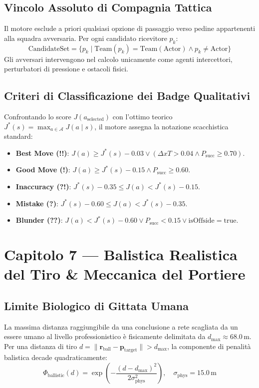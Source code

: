 \documentclass[11pt,a4paper]{article}
\begin{document}
\subsection{Vincolo Assoluto di Compagnia Tattica}
Il motore esclude a priori qualsiasi opzione di passaggio verso pedine appartenenti alla squadra avversaria. Per ogni candidato ricevitore $p_k$:
\begin{equation}
\text{CandidateSet} = \{ p_k \mid \text{Team}(p_k) = \text{Team}(\text{Actor}) \land p_k \ne \text{Actor} \}
\end{equation}
Gli avversari intervengono nel calcolo unicamente come agenti intercettori, perturbatori di pressione e ostacoli fisici.

\subsection{Criteri di Classificazione dei Badge Qualitativi}
Confrontando lo score $J(a_{\text{selected}})$ con l'ottimo teorico $J^*(s) = \max_{a \in \mathcal{A}} J(a \mid s)$, il motore assegna la notazione scacchistica standard:
\begin{itemize}
    \item \textbf{Best Move (!!)}: $J(a) \ge J^*(s) - 0.03 \lor (\Delta xT > 0.04 \land P_{\text{succ}} \ge 0.70)$.
    \item \textbf{Good Move (!)}: $J(a) \ge J^*(s) - 0.15 \land P_{\text{succ}} \ge 0.60$.
    \item \textbf{Inaccuracy (?!)}: $J^*(s) - 0.35 \le J(a) < J^*(s) - 0.15$.
    \item \textbf{Mistake (?)}: $J^*(s) - 0.60 \le J(a) < J^*(s) - 0.35$.
    \item \textbf{Blunder (??)}: $J(a) < J^*(s) - 0.60 \lor P_{\text{succ}} < 0.15 \lor \text{isOffside} = \text{true}$.
\end{itemize}


\section{Capitolo 7 — Balistica Realistica del Tiro \& Meccanica del Portiere}

\subsection{Limite Biologico di Gittata Umana}
La massima distanza raggiungibile da una conclusione a rete scagliata da un essere umano al livello professionistico è fisicamente delimitata da $d_{\max} \approx 68.0\,\text{m}$. Per una distanza di tiro $d = \|\mathbf{r}_{\text{ball}} - \mathbf{p}_{\text{target}}\| > d_{\max}$, la componente di penalità balistica decade quadraticamente:
\begin{equation}
\Phi_{\text{ballistic}}(d) = \exp\left( -\frac{(d - d_{\max})^2}{2 \sigma_{\text{phys}}^2} \right), \quad \sigma_{\text{phys}} = 15.0\,\text{m}
\end{equation}
\end{document}
